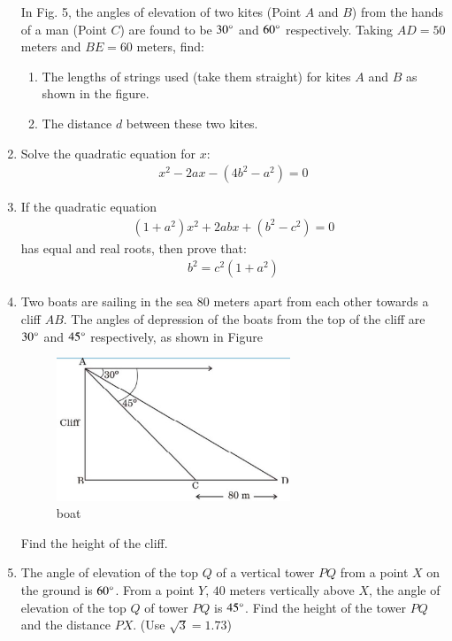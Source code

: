 \documentclass{article}
\theoremstyle{remark}
\begin{document}
\begin{enumerate}
    In Fig. 5, the angles of elevation of two kites (Point $A$ and $B$) from the hands of a man (Point $C$) are found to be $30\degree$ and $60\degree$ respectively. Taking $AD = 50$ meters and $BE = 60$ meters, find:
    \begin{enumerate}
        \item The lengths of strings used (take them straight) for kites $A$ and $B$ as shown in the figure.
        \item The distance $d$ between these two kites.
    \end{enumerate}
    
    \item Solve the quadratic equation for $x$:
    \begin{align}
        x^2 - 2ax - (4b^2 - a^2) = 0
    \end{align}
    
    \item If the quadratic equation
    \begin{align}
        (1+a^2)x^2 + 2abx + (b^2-c^2) = 0
    \end{align}
    has equal and real roots, then prove that:
    \begin{align}
        b^2 = c^2(1+a^2)
    \end{align}
    
    \item Two boats are sailing in the sea $80$ meters apart from each other towards a cliff $AB$. The angles of depression of the boats from the top of the cliff are $30\degree$ and $45\degree$ respectively, as shown in Figure 
    
    \begin{figure}[H]
        \centering
        \includegraphics[width=70mm]{figs/boat.edit.jpeg}
        \caption{boat}
        \label{fig:boat.jpeg}
    \end{figure}
    
    Find the height of the cliff.
    
    \item The angle of elevation of the top $Q$ of a vertical tower $PQ$ from a point $X$ on the ground is $60\degree$. From a point $Y$, $40$ meters vertically above $X$, the angle of elevation of the top $Q$ of tower $PQ$ is $45\degree$. Find the height of the tower $PQ$ and the distance $PX$. (Use $\sqrt{3} = 1.73$)
    

\end{enumerate}
\end{document}
